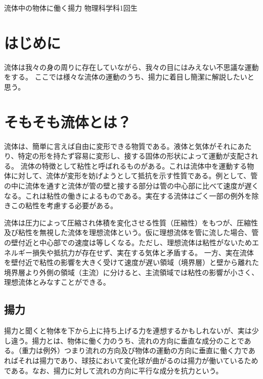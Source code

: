 \documentclass[10pt,b5paper,papersize,dvipdfmx]{jsbook}
\begin{document}


\kaishititle%
  {流体中の物体に働く揚力}%
  {物理科学科1回生}%
  {}%

%
\section*{はじめに}
流体は我々の身の周りに存在していながら、我々の目にはみえない不思議な運動をする。
ここでは様々な流体の運動のうち、揚力に着目し簡潔に解説したいと思う。

\section{そもそも流体とは？}
流体は、簡単に言えば自由に変形できる物質である。液体と気体がそれにあたり、特定の形を持たず容易に変形し、接する固体の形状によって運動が支配される。
流体の特徴として粘性と呼ばれるものがある。これは流体中を運動する物体に対して、流体が変形を妨げようとして抵抗を示す性質である。例として、管の中に流体を通すと流体が管の壁と接する部分は管の中心部に比べて速度が遅くなる。これは粘性の働きによるものである。実在する流体はごく一部の例外を除きこの粘性を考慮する必要がある。
\par
流体は圧力によって圧縮され体積を変化させる性質（圧縮性）をもつが、圧縮性及び粘性を無視した流体を理想流体という。仮に理想流体を管に流した場合、管の壁付近と中心部での速度は等しくなる。ただし、理想流体は粘性がないためエネルギー損失や抵抗力が存在せず、実在する気体と矛盾する。
一方、実在流体を壁付近で粘性の影響を大きく受けて速度が遅い領域（境界層）と壁から離れた境界層より外側の領域（主流）に分けると、主流領域では粘性の影響が小さく、理想流体とみなすことができる。

\subsection{揚力}
揚力と聞くと物体を下から上に持ち上げる力を連想するかもしれないが、実は少し違う。揚力とは、物体に働く力のうち、流れの方向に垂直な成分のことである。（重力は例外）つまり流れの方向及び物体の運動の方向に垂直に働く力であればそれは揚力であり、球技において変化球が曲がるのは揚力が働いているためである。なお、揚力に対して流れの方向に平行な成分を抗力という。
\end{document}

